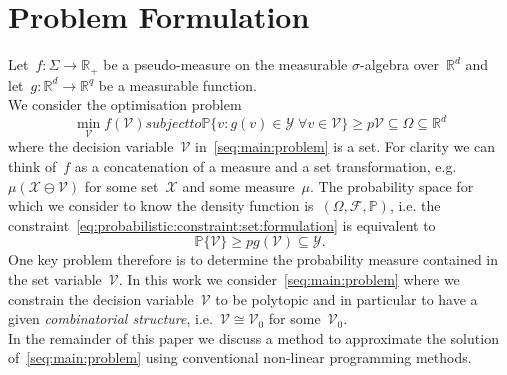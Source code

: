 \documentclass[letterpaper, 10pt, conference]{ieeeconf} %
\begin{document}
\section{Problem Formulation}\label{sec:problem:formulation}
%
%
%
\noindent Let~$f:\Sigma\rightarrow\mathbb R_+$ be a pseudo-measure on the measurable $\sigma$-algebra over~$\mathbb R^d$ and let~$g:\mathbb R^d\rightarrow \mathbb R^q$ be a measurable function.
%
\\[1em]
%
We consider the optimisation problem
%
\begin{subequations}\label{seq:main:problem}
\begin{equation}
\min_{\mathcal V} f(\mathcal V)
\end{equation}
subject to
\begin{equation}\label{eq:probabilistic:constraint:set:formulation}
	\mathbb P\{v:g(v)\in\mathcal Y\;\forall v\in\mathcal V\}\geq p
\end{equation}
%
\begin{equation}
	\mathcal V\subseteq\Omega\subseteq \mathbb R^d
\end{equation}
\end{subequations}
%
where the decision variable~$\mathcal V$ in~\eqref{seq:main:problem} is a set.
%
For clarity we can think of~$f$ as a concatenation of a measure and a set transformation, e.g.~$\mu(\mathcal X\ominus\mathcal V)$ for some set~$\mathcal X$ and some measure~$\mu$.
%
The probability space for which we consider to know the density function is~$(\Omega,\mathscr F,\mathbb P)$, i.e. the constraint~\eqref{eq:probabilistic:constraint:set:formulation} is equivalent to
%
\begin{subequations}
\begin{equation}
	\mathbb P\{\mathcal V\}\geq p
\end{equation}
%
\begin{equation}
	g(\mathcal V)\subseteq\mathcal Y.
\end{equation}
\end{subequations}
%
One key problem therefore is to determine the probability measure contained in the set variable~$\mathcal V$.
%
In this work we consider~\eqref{seq:main:problem} where we constrain the decision variable~$\mathcal V$ to be polytopic and in particular to have a given \emph{combinatorial structure}, i.e.~$\mathcal V\cong\mathcal V_0$ for some~$\mathcal V_0$.
%
\\[1em]
%
In the remainder of this paper we discuss a method to approximate the solution of~\eqref{seq:main:problem} using conventional non-linear programming methods.
\end{document}
